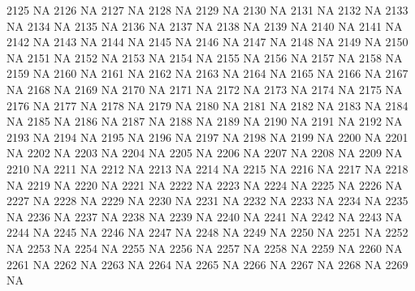 \documentclass{article}
\begin{document}
\begin{Schunk}
\begin{Soutput}
2125           NA
2126           NA
2127           NA
2128           NA
2129           NA
2130           NA
2131           NA
2132           NA
2133           NA
2134           NA
2135           NA
2136           NA
2137           NA
2138           NA
2139           NA
2140           NA
2141           NA
2142           NA
2143           NA
2144           NA
2145           NA
2146           NA
2147           NA
2148           NA
2149           NA
2150           NA
2151           NA
2152           NA
2153           NA
2154           NA
2155           NA
2156           NA
2157           NA
2158           NA
2159           NA
2160           NA
2161           NA
2162           NA
2163           NA
2164           NA
2165           NA
2166           NA
2167           NA
2168           NA
2169           NA
2170           NA
2171           NA
2172           NA
2173           NA
2174           NA
2175           NA
2176           NA
2177           NA
2178           NA
2179           NA
2180           NA
2181           NA
2182           NA
2183           NA
2184           NA
2185           NA
2186           NA
2187           NA
2188           NA
2189           NA
2190           NA
2191           NA
2192           NA
2193           NA
2194           NA
2195           NA
2196           NA
2197           NA
2198           NA
2199           NA
2200           NA
2201           NA
2202           NA
2203           NA
2204           NA
2205           NA
2206           NA
2207           NA
2208           NA
2209           NA
2210           NA
2211           NA
2212           NA
2213           NA
2214           NA
2215           NA
2216           NA
2217           NA
2218           NA
2219           NA
2220           NA
2221           NA
2222           NA
2223           NA
2224           NA
2225           NA
2226           NA
2227           NA
2228           NA
2229           NA
2230           NA
2231           NA
2232           NA
2233           NA
2234           NA
2235           NA
2236           NA
2237           NA
2238           NA
2239           NA
2240           NA
2241           NA
2242           NA
2243           NA
2244           NA
2245           NA
2246           NA
2247           NA
2248           NA
2249           NA
2250           NA
2251           NA
2252           NA
2253           NA
2254           NA
2255           NA
2256           NA
2257           NA
2258           NA
2259           NA
2260           NA
2261           NA
2262           NA
2263           NA
2264           NA
2265           NA
2266           NA
2267           NA
2268           NA
2269           NA

\end{Soutput}
\end{Schunk}
\end{document}
